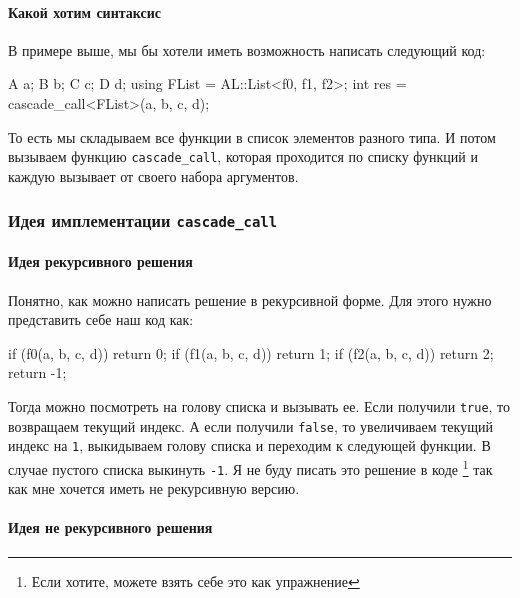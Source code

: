 \paragraph{Какой хотим синтаксис}

В примере выше, мы бы хотели иметь возможность написать следующий код:
\begin{cppcode}[\nonumbers]
A a; B b; C c; D d;
using FList = AL::List<f0, f1, f2>;
int res = cascade_call<FList>(a, b, c, d);
\end{cppcode}
То есть мы складываем все функции в список элементов разного типа.
И потом вызываем функцию \verb"cascade_call", которая проходится по списку функций и каждую вызывает от своего набора аргументов.

\subsubsection{Идея имплементации \texttt{cascade\_call}}

\paragraph{Идея рекурсивного решения}

Понятно, как можно написать решение в рекурсивной форме.
Для этого нужно представить себе наш код как:
\begin{cppcode}
if (f0(a, b, c, d))
  return 0;
if (f1(a, b, c, d))
  return 1;
if (f2(a, b, c, d))
  return 2;
return -1;
\end{cppcode}
Тогда можно посмотреть на голову списка и вызывать ее. Если получили \verb"true", то возвращаем текущий индекс.
А если получили \verb"false", то увеличиваем текущий индекс на \verb"1", выкидываем голову списка и переходим к следующей функции.
В случае пустого списка выкинуть \verb"-1".
Я не буду писать это решение в коде%
\footnote{Если хотите, можете взять себе это как упражнение}
так как мне хочется иметь не рекурсивную версию.

\paragraph{Идея не рекурсивного решения}


